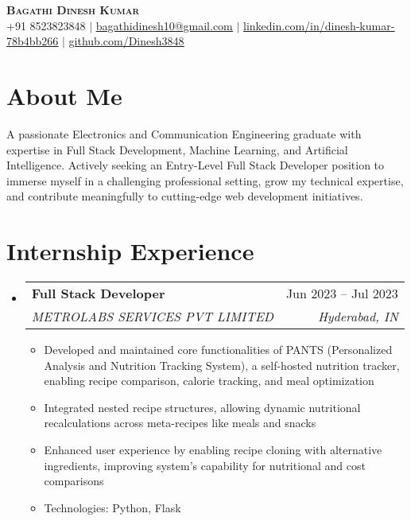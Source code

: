 \documentclass[letterpaper,9pt]{article}
\makeatletter
\newcommand{\resumeItem}[1]{
  \item\small{
    {#1 \vspace{-2pt}}
  }
}
\newcommand{\resumeSubheading}[4]{
  \vspace{-2pt}\item
    \begin{tabular*}{0.97\textwidth}[t]{l@{\extracolsep{\fill}}r}
      \textbf{#1} & #2 \\
      \textit{\small#3} & \textit{\small #4} \\
    \end{tabular*}\vspace{-7pt}
}
\newcommand{\resumeSubHeadingListStart}{\begin{itemize}[leftmargin=0.15in, label={}]}
\newcommand{\resumeSubHeadingListEnd}{\end{itemize}}
\newcommand{\resumeItemListStart}{\begin{itemize}}
\newcommand{\resumeItemListEnd}{\end{itemize}\vspace{-5pt}}
\makeatother
\begin{document}
\begin{center}
    \textbf{\Huge \scshape Bagathi Dinesh Kumar} \\ \vspace{1pt}
    \small +91 8523823848 $|$ \href{mailto:bagathidinesh10@gmail.com}{\underline{bagathidinesh10@gmail.com}} $|$ 
    \href{https://linkedin.com/in/dinesh-kumar-78b4bb266}{\underline{linkedin.com/in/dinesh-kumar-78b4bb266}} $|$
    \href{https://github.com/Dinesh3848}{\underline{github.com/Dinesh3848}}
\end{center}

\section{About Me}
A passionate Electronics and Communication Engineering graduate with expertise in Full Stack Development, Machine Learning, and Artificial Intelligence. Actively seeking an Entry-Level Full Stack Developer position to immerse myself in a challenging professional setting, grow my technical expertise, and contribute meaningfully to cutting-edge web development initiatives.

\section{Internship Experience}
  \resumeSubHeadingListStart

    \resumeSubheading
      {Full Stack Developer}{Jun 2023 -- Jul 2023}
      {METROLABS SERVICES PVT LIMITED}{Hyderabad, IN}
      \resumeItemListStart
        \resumeItem{Developed and maintained core functionalities of PANTS (Personalized Analysis and Nutrition Tracking System), a self-hosted nutrition tracker, enabling recipe comparison, calorie tracking, and meal optimization}
        \resumeItem{Integrated nested recipe structures, allowing dynamic nutritional recalculations across meta-recipes like meals and snacks}
        \resumeItem{Enhanced user experience by enabling recipe cloning with alternative ingredients, improving system's capability for nutritional and cost comparisons}
        \resumeItem{Technologies: Python, Flask}
      \resumeItemListEnd

  \resumeSubHeadingListEnd

\end{document}
